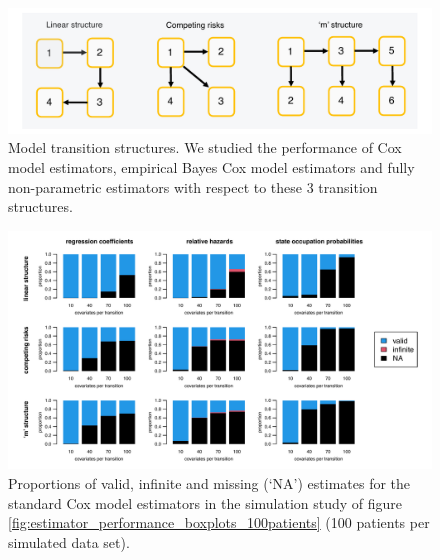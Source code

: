     \begin{figure}[h] 
    \centering         
    \includegraphics[width=14.5cm, angle=0]{figures/transition_structures.pdf} %
    \vspace*{0.25cm}     %
    \caption{Model transition structures. We studied the performance of Cox model estimators, empirical Bayes Cox  model estimators and fully non-parametric estimators with respect to these 3 transition structures.}      
    \label{fig:transition_structures} %
    \end{figure} 
    
    \begin{figure}[h] 
    \centering         
    \includegraphics[width=14.5cm, angle=0]{figures/na_props_100patients_coxph.pdf} %
    \vspace*{0.25cm}     %
    \caption{Proportions of valid, infinite and missing (`NA') estimates for the standard Cox model estimators in the simulation study of figure \ref{fig:estimator_performance_boxplots_100patients} (100 patients per simulated data set).}  
    \label{fig:na_props_100patients_coxph} %
    \end{figure} 
    
